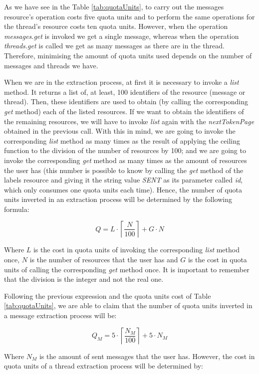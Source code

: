 As we have see in the Table \ref{tab:quotaUnits}, to carry out the messages resource's operation costs five quota units and to perform the same operations for the thread's resource costs ten quota units. However, when the operation \textit{messages.get} is invoked we get a single message, whereas when the operation \textit{threads.get} is called we get as many messages as there are in the thread. Therefore, minimising the amount of quota units used depends on the number of messages and threads we have.

When we are in the extraction process, at first it is necessary to invoke a \textit{list} method. It returns a list of, at least, 100 identifiers of the resource (message or thread). Then, these identifiers are used to obtain (by calling the corresponding \textit{get} method) each of the listed resources. If we want to obtain the identifiers of the remaining resources, we will have to invoke \textit{list} again with the \textit{nextTokenPage} obtained in the previous call. With this in mind, we are going to invoke the corresponding \textit{list} method as many times as the result of applying the ceiling function to the division of the number of resources by 100; and we are going to invoke the corresponding \textit{get} method as many times as the amount of resources the user has (this number is possible to know by calling the \textit{get} method of the labels resource and giving it the string value \textit{SENT} as its parameter called \textit{id}, which only consumes one quota units each time). Hence, the number of quota units inverted in an extraction process will be determined by the following formula:

$$
Q = L\cdot\left\lceil\frac{N}{100}\right\rceil+G\cdot N
$$

Where $L$ is the cost in quota units of invoking the corresponding \textit{list} method once, $N$ is the number of resources that the user has and $G$ is the cost in quota units of calling the corresponding \textit{get} method once. It is important to remember that the division is the integer and not the real one.

Following the previous expression and the quota units cost of Table \ref{tab:quotaUnits}, we are able to claim that the number of quota units inverted in a message extraction process will be:

$$
Q_M = 5\cdot\left\lceil\frac{N_M}{100}\right\rceil+5\cdot N_M
$$

Where $N_M$ is the amount of sent messages that the user has. However, the cost in quota units of a thread extraction process will be determined by:

